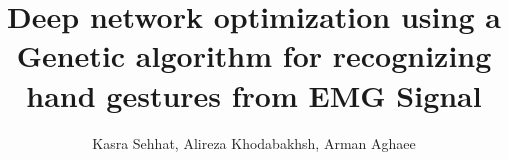 \documentclass[10pt,twocolumn,twoside,letterpaper]{IEEEtran}
\begin{document}
\title{
Deep network optimization using a Genetic algorithm for recognizing hand gestures from EMG Signal
}
\author{Kasra Sehhat, Alireza Khodabakhsh, Arman Aghaee}



\maketitle



























\end{document}

